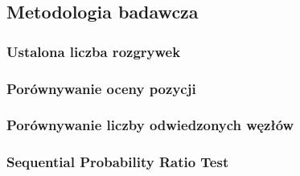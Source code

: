 \subsection{Metodologia badawcza}
\label{subsec:metodologia-badawcza}


\subsubsection{Ustalona liczba rozgrywek}


\subsubsection{Porównywanie oceny pozycji}
\subsubsection{Porównywanie liczby odwiedzonych węzłów}
\subsubsection{Sequential Probability Ratio Test}
